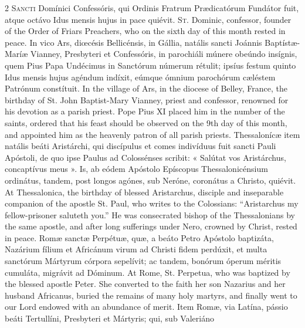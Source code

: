 \begin{paracol}{2}
\lettrine[lines=2]{S}{ancti} Domínici 
 Confessóris, qui Ordinis Fratrum Prædicatórum Fundátor fuit, atque octávo 
 Idus mensis hujus in pace quiévit.
\switchcolumn
{}
\lettrine[lines=2]{S}{t.} Dominic, confessor, founder of 
 the Order of Friars Preachers, who on the sixth day of this month rested in 
 peace.
\switchcolumn*
{}
In vico Ars, diœcésis 
 Bellicénsis, in Gállia, natális sancti Joánnis Baptístæ-Maríæ Vianney, 
 Presbyteri et Confessóris, in parochiáli múnere obeúndo insígnis, quem Pius 
 Papa Undécimus in Sanctórum númerum rétulit; ipsíus festum quinto Idus mensis hujus agéndum indíxit, eúmque ómnium parochórum cæléstem Patrónum 
 constítuit.
\switchcolumn
{}
In the village of Ars, in the 
 diocese of Belley, France, the birthday of St. John Baptist-Mary Vianney, priest and 
 confessor, renowned for his devotion as a parish priest. Pope Pius XI 
 placed him in the number of the saints, ordered that his feast should be 
 observed on the 9th day of this month, and appointed him as the heavenly 
 patron of all parish priests.
\switchcolumn*
{}
Thessalonícæ item 
 natális beáti Aristárchi, qui discípulus et comes indivíduus fuit sancti 
 Pauli Apóstoli, de quo ipse Paulus ad Colossénses scribit: « Salútat vos 
 Aristárchus, concaptívus meus ». Is, ab eódem Apóstolo Epíscopus 
 Thessalonicénsium ordinátus, tandem, post longos agónes, sub Neróne, 
 coronátus a Christo, quiévit.
\switchcolumn
{}
At Thessalonica, the birthday of 
 blessed Aristarchus, disciple and inseparable companion of the apostle St. 
 Paul, who writes to the Colossians: ``Aristarchus my fellow-prisoner saluteth 
 you.'' He was consecrated bishop of the Thessalonians by the same 
 apostle, and after long sufferings under Nero, crowned by Christ, rested in 
 peace.
\switchcolumn*
{}
Romæ sanctæ Perpétuæ, 
 quæ, a beáto Petro Apóstolo baptizáta, Nazárium fílium et Africánum virum ad 
 Christi fidem perdúxit, et multa sanctórum Mártyrum córpora sepelívit; ac 
 tandem, bonórum óperum méritis cumuláta, migrávit ad Dóminum.
\switchcolumn
{}
At Rome, St. Perpetua, who was 
 baptized by the blessed apostle Peter. She converted to the faith her 
 son Nazarius and her husband Africanus, buried the remains of many holy 
 martyrs, and finally went to our Lord endowed with an abundance of merit.
\switchcolumn*
{}
Item Romæ, via Latína, pássio beáti Tertullíni, Presbyteri et Mártyris; qui, sub Valeriáno 

\end{paracol}
